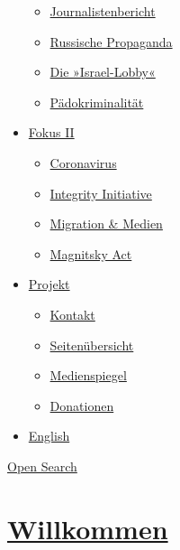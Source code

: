 \begin{itemize}
  \begin{itemize}
  \tightlist
  \item
    \href{https://swprs.org/bericht-eines-journalisten/}{Journalistenbericht}
  \item
    \href{https://swprs.org/russische-propaganda/}{Russische Propaganda}
  \item
    \href{https://swprs.org/die-israel-lobby-fakten-und-mythen/}{Die
    »Israel-Lobby«}
  \item
    \href{https://swprs.org/geopolitik-und-paedokriminalitaet/}{Pädokriminalität}
  \end{itemize}
\item
  \href{https://swprs.org/migration-und-medien/}{Fokus II}

  \begin{itemize}
  \tightlist
  \item
    \href{https://swprs.org/covid-19-hinweis-ii/}{Coronavirus}
  \item
    \href{https://swprs.org/die-integrity-initiative/}{Integrity
    Initiative}
  \item
    \href{https://swprs.org/migration-und-medien/}{Migration \& Medien}
  \item
    \href{https://swprs.org/der-fall-magnitsky/}{Magnitsky Act}
  \end{itemize}
\item
  \href{https://swprs.org/kontakt/}{Projekt}

  \begin{itemize}
  \tightlist
  \item
    \href{https://swprs.org/kontakt/}{Kontakt}
  \item
    \href{https://swprs.org/uebersicht/}{Seitenübersicht}
  \item
    \href{https://swprs.org/medienspiegel/}{Medienspiegel}
  \item
    \href{https://swprs.org/donationen/}{Donationen}
  \end{itemize}
\item
  \href{https://swprs.org/contact/}{English}
\end{itemize}

\protect\hyperlink{}{Open Search}

\hypertarget{willkommen}{%
\section{\texorpdfstring{\href{https://swprs.org/2018/10/09/willkommen/}{Willkommen}}{Willkommen}}\label{willkommen}}

